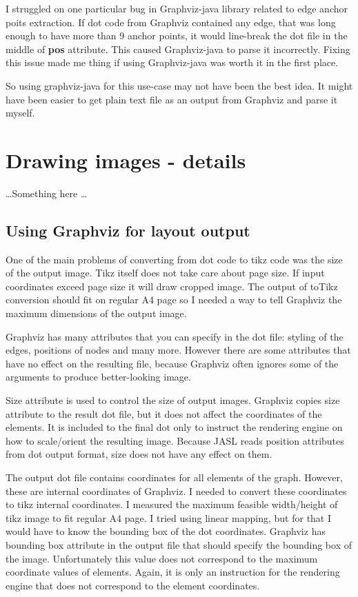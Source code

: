 \documentclass{ctuthesis}
\begin{document}
I struggled on one particular bug in Graphviz-java library related to edge anchor poits extraction. If dot code from Graphviz contained any edge, that was long enough to have more than 9 anchor points, it would line-break the dot file in the middle of \textbf{pos} attribute. This caused Graphviz-java to parse it incorrectly. Fixing this issue made me thing if using Graphviz-java was worth it in the first place.

So using graphviz-java for this use-case may not have been the best idea. It might have been easier to get plain text file as an output from Graphviz and parse it myself. 

\chapter{Drawing images - details}

\ldots Something here \ldots


\section{Using Graphviz for layout output}
\label{sec:problems_graphviz}

One of the main problems of converting from dot code to tikz code was the size of the output image. Tikz itself does not take care about page size. If input coordinates exceed page size it will draw cropped image. The output of toTikz conversion should fit on regular A4 page so I needed a way to tell Graphviz the maximum dimensions of the output image. 

Graphviz has many attributes that you can specify in the dot file: styling of the edges, positions of nodes and many more. However there are some attributes that have no effect on the resulting file, because Graphviz often ignores some of the arguments to produce better-looking image.

Size attribute is used to control the size of output images. Graphviz copies size attribute to the result dot file, but it does not affect the coordinates of the elements. It is included to the final dot only to instruct the rendering engine on how to scale/orient the resulting image. Because JASL reads position attributes from dot output format, size does not have any effect on them.

The output dot file contains coordinates for all elements of the graph. However, these are internal coordinates of Graphviz. I needed to convert these coordinates to tikz internal coordinates. I measured the maximum feasible width/height of tikz image to fit regular A4 page. I tried using linear mapping, but for that I would have to know the bounding box of the dot coordinates. Graphviz has bounding box attribute in the output file that should specify the bounding box of the image. Unfortunately this value does not correspond to the maximum coordinate values of elements. Again, it is only an instruction for the rendering engine that does not correspond to the element coordinates.
\end{document}
